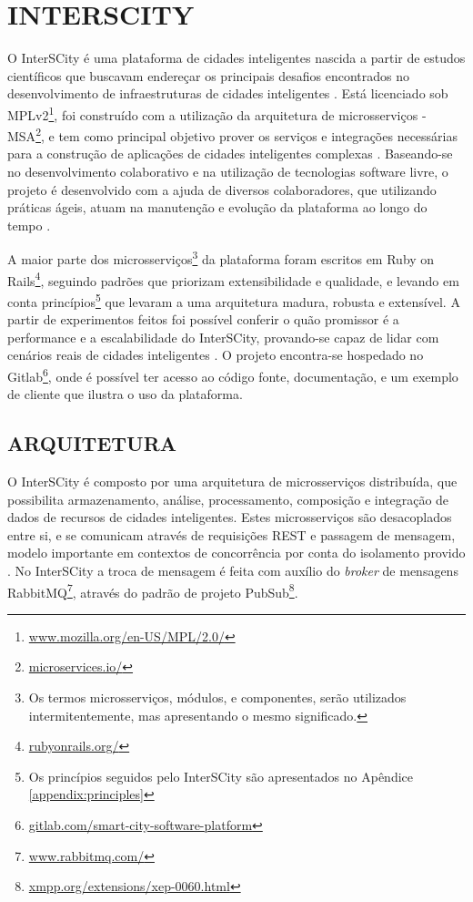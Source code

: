 \chapter[INTERSCITY]{INTERSCITY}
\label{chapter:interscity}

O InterSCity é uma plataforma de cidades inteligentes nascida a partir de
estudos científicos que buscavam endereçar os principais desafios encontrados
no desenvolvimento de infraestruturas de cidades inteligentes \cite{nof2016}.
Está licenciado sob
MPLv2\footnote{\url{www.mozilla.org/en-US/MPL/2.0/}}, foi construído com a
utilização da arquitetura de microsserviços -
MSA\footnote{\url{microservices.io/}}, e tem como principal objetivo prover os
serviços e integrações necessárias para a construção de aplicações de cidades
inteligentes complexas \cite{delesposte2017}. Baseando-se no desenvolvimento
colaborativo e na utilização de tecnologias software livre, o projeto é
desenvolvido com a ajuda de diversos colaboradores, que utilizando práticas
ágeis, atuam na manutenção e evolução da plataforma ao longo do tempo
\cite{delesposte2017}.

A maior parte dos microsserviços\footnote{Os termos microsserviços, módulos, e
componentes, serão utilizados intermitentemente, mas apresentando o mesmo
significado.} da plataforma foram escritos em Ruby on Rails\footnote{\url{rubyonrails.org/}},
seguindo padrões que priorizam extensibilidade e qualidade, e levando em conta
princípios\footnote{Os princípios seguidos pelo InterSCity são apresentados no
Apêndice \ref{appendix:principles}} que levaram a uma arquitetura madura,
robusta e extensível. A partir de experimentos feitos foi possível conferir
o quão promissor é a performance e a escalabilidade do InterSCity, provando-se
capaz de lidar com cenários reais de cidades inteligentes \cite{delesposte2017}.
O projeto encontra-se hospedado no
Gitlab\footnote{\url{gitlab.com/smart-city-software-platform}},
onde é possível ter acesso ao código fonte, documentação, e um exemplo de
cliente que ilustra o uso da plataforma.

\section{ARQUITETURA}
\label{sec:architecture}

O InterSCity é composto por uma arquitetura de microsserviços distribuída,
que possibilita armazenamento, análise, processamento, composição e
integração de dados de recursos de cidades inteligentes. Estes microsserviços
são desacoplados entre si, e se comunicam através de requisições REST e
passagem de mensagem, modelo importante em contextos de concorrência por conta
do isolamento provido \cite{armstrong2003}. No InterSCity a troca de mensagem
é feita com auxílio do \textit{broker} de mensagens
RabbitMQ\footnote{\url{www.rabbitmq.com/}}, através do padrão de projeto
PubSub\footnote{\url{xmpp.org/extensions/xep-0060.html}}.

